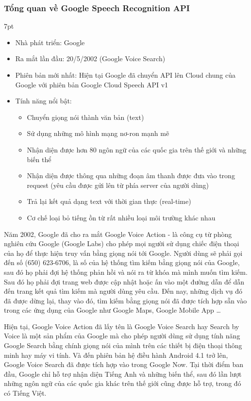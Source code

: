 \documentclass[12pt]{report}
\newenvironment{formal}{%
  \def\FrameCommand{%
    \hspace{1pt}%
    {\color{mygray}\vrule width 6pt}%
    {\color{lightgray}\vrule width 4pt}%
    \colorbox{lightgray}%
  }%
  \MakeFramed{\advance\hsize-\width\FrameRestore}%
  \noindent\hspace{-4.55pt}%
  \begin{adjustwidth}{}{7pt}%
  \vspace{2pt}\vspace{2pt}%
}
{%
  \vspace{2pt}\end{adjustwidth}\endMakeFramed%
}
\begin{document}
\subsubsection{Tổng quan về Google Speech Recognition API}
\begin{formal}
	\begin{itemize}
		\item Nhà phát triển: Google
		\item Ra mắt lần đầu: 20/5/2002 (Google Voice Search)
		\item Phiên bản mới nhất: Hiện tại Google đã chuyển API lên Cloud chung của Google với phiên bản Google Cloud Speech API v1
		\item Tính năng nổi bật:
		\begin{itemize}
			\item Chuyển giọng nói thành văn bản (text)
			\item Sử dụng những mô hình mạng nơ-ron mạnh mẽ
			\item Nhận diện được hơn 80 ngôn ngữ của các quốc gia trên thế giới và những biến thể
			\item Nhận diện được thông qua những đoạn âm thanh được đưa vào trong request (yêu cầu được gửi lên từ phía server của người dùng)
			\item Trả lại kết quả dạng text với thời gian thực (real-time)
			\item Cơ chế loại bỏ tiếng ồn từ rất nhiều loại môi trường khác nhau
		\end{itemize}
	\end{itemize}
\end{formal}

Năm 2002, Google đã cho ra mắt Google Voice Action - là công cụ từ phòng nghiên cứu Google (Google Labs) cho phép mọi người sử dụng chiếc điện thoại của họ để thực hiện truy vấn bằng giọng nói tới Google. Người dùng sẽ phải gọi đến số (650) 623-6706, là số của hệ thống tìm kiếm bằng giọng nói của Google, sau đó họ phải đợi hệ thống phản hồi và nói ra từ khóa mà mình muốn tìm kiếm. Sau đó họ phải đợi trang web được cập nhật hoặc ấn vào một đường dẫn để dẫn đến trang kết quả tìm kiếm mà người dùng yêu cầu. Đến nay, những dịch vụ đó đã được dừng lại, thay vào đó, tìm kiếm bằng giọng nói đã được tích hợp sẵn vào trong các ứng dụng của Google như Google Maps, Google Mobile App \ldots

Hiện tại, Google Voice Action đã lấy tên là Google Voice Search hay Search by Voice là một sản phẩm của Google mà cho phép người dùng sử dụng tính năng Google Search bằng chính giọng nói của mình trên các thiết bị điện thoại thông minh hay máy vi tính. Và đến phiên bản hệ điều hành Android 4.1 trở lên, Google Voice Search đã được tích hợp vào trong Google Now. Tại thời điểm ban đầu, Google chỉ hỗ trợ nhận diện Tiếng Anh và những biến thể, sau đó lần lượt những ngôn ngữ của các quốc gia khác trên thế giới cũng được hỗ trợ, trong đó có Tiếng Việt.
\end{document}
